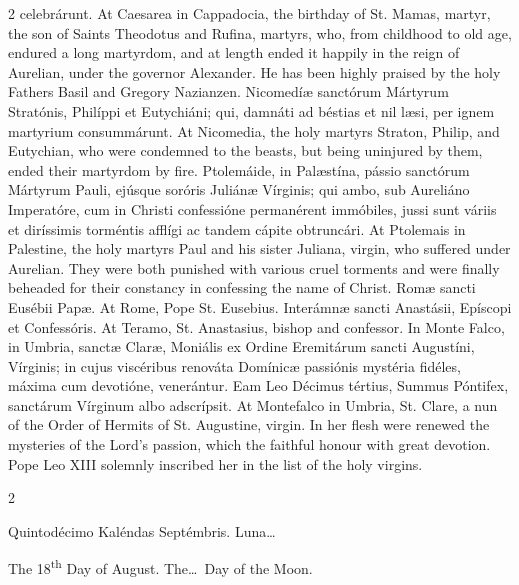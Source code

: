 \begin{paracol}{2}
 celebrárunt.
\switchcolumn
{}
At Caesarea in Cappadocia, the 
 birthday of St. Mamas, martyr, the son of Saints Theodotus and Rufina, 
 martyrs, who, from childhood to old age, endured a long martyrdom, and at 
 length ended it happily in the reign of Aurelian, under the governor 
 Alexander. He has been highly praised by the holy Fathers Basil and 
 Gregory Nazianzen.
\switchcolumn*
{}
Nicomedíæ sanctórum 
 Mártyrum Stratónis, Philíppi et Eutychiáni; qui, damnáti ad béstias et nil 
 læsi, per ignem martyrium consummárunt.
\switchcolumn
{}
At Nicomedia, the holy martyrs 
 Straton, Philip, and Eutychian, who were condemned to the beasts, but being 
 uninjured by them, ended their martyrdom by fire.
\switchcolumn*
{}
Ptolemáide, in 
 Palæstína, pássio sanctórum Mártyrum Pauli, ejúsque soróris Juliánæ Vírginis; 
 qui ambo, sub Aureliáno Imperatóre, cum in Christi confessióne permanérent 
 immóbiles, jussi sunt váriis et diríssimis torméntis afflígi ac tandem 
 cápite obtruncári.
\switchcolumn
{}
At Ptolemais in Palestine, the holy 
 martyrs Paul and his sister Juliana, virgin, who suffered under Aurelian. 
 They were both punished with various cruel torments and were finally 
 beheaded for their constancy in confessing the name of Christ.
\switchcolumn*
{}
Romæ sancti Eusébii 
 Papæ.
\switchcolumn
{}
At Rome, Pope St. Eusebius.
\switchcolumn*
{}
Interámnæ sancti 
 Anastásii, Epíscopi et Confessóris.
\switchcolumn
{}
At Teramo, St. Anastasius, bishop 
 and confessor.
\switchcolumn*
{}
In Monte Falco, in 
 Umbria, sanctæ Claræ, Moniális ex Ordine Eremitárum sancti Augustíni, 
 Vírginis; in cujus viscéribus renováta Domínicæ passiónis mystéria fidéles, 
 máxima cum devotióne, venerántur. Eam Leo Décimus tértius, Summus 
 Póntifex, sanctárum Vírginum albo adscrípsit.
\switchcolumn
{}
At Montefalco in Umbria, St. Clare, 
 a nun of the Order of Hermits of St. Augustine, virgin. In her flesh 
 were renewed the mysteries of the Lord's passion, which the faithful honour 
 with great devotion. Pope Leo XIII solemnly inscribed her in the list 
 of the holy virgins.
\switchcolumn*
{}
\end{paracol}


\begin{paracol}{2}
\begin{center}{\color{gregoriocolor} Quintodécimo Kaléndas Septémbris. 
 Luna\dots\ }\end{center}
\switchcolumn
{}
\begin{center}{\color{gregoriocolor} The 
 18\textsuperscript{th} Day of 
 August. The\dots\ Day of the Moon.}\end{center}
\end{paracol}

